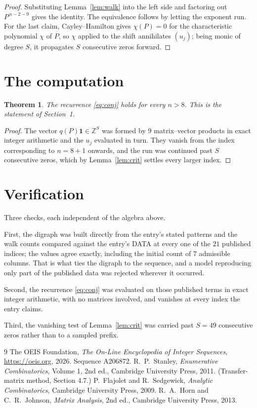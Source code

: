 \documentclass[11pt,a4paper]{article}
\theoremstyle{plain}
\newtheorem{theorem}{Theorem}
\theoremstyle{definition}
\begin{document}
\begin{proof}
Substituting Lemma~\ref{lem:walk} into the left side and factoring out
$P^{\,n-2-9}$ gives the identity. The equivalence follows by letting the exponent
run. For the last claim, Cayley--Hamilton gives $\chi(P)=0$ for the characteristic
polynomial $\chi$ of $P$, so $\chi$ applied to the shift annihilates $(u_j)$; being monic of
degree $S$, it propagates $S$ consecutive zeros forward.
\end{proof}

\section{The computation}

\begin{theorem}
The recurrence \eqref{eq:conj} holds for every $n>8$. This is the statement of
Section~1.
\end{theorem}

\begin{proof}
The vector $q(P)\mathbf{1}\in\mathbb{Z}^{S}$ was formed by $9$ matrix--vector
products in exact integer arithmetic and the $u_j$ evaluated in turn. They vanish from the
index corresponding to $n=8+1$ onwards, and the run was continued past $S$ consecutive
zeros, which by Lemma~\ref{lem:crit} settles every larger index.
\end{proof}

\section{Verification}

Three checks, each independent of the algebra above.

First, the digraph was built directly from the entry's stated patterns and the walk counts
compared against the entry's DATA at every one of the $21$ published indices; the
values agree exactly, including the initial count of $7$ admissible columns. That is
what ties the digraph to the sequence, and a model reproducing only part of the published
data was rejected wherever it occurred.

Second, the recurrence \eqref{eq:conj} was evaluated on those published terms in exact
integer arithmetic, with no matrices involved, and vanishes at every index the entry claims.

Third, the vanishing test of Lemma~\ref{lem:crit} was carried past $S=49$ consecutive
zeros rather than to a sampled prefix.

\begin{thebibliography}{9}
 The OEIS Foundation, \emph{The On-Line Encyclopedia of Integer
Sequences}, \url{https://oeis.org}, 2026. Sequence A206872.
 R.~P.~Stanley, \emph{Enumerative Combinatorics}, Volume 1, 2nd ed.,
Cambridge University Press, 2011. (Transfer-matrix method, Section 4.7.)
 P.~Flajolet and R.~Sedgewick, \emph{Analytic Combinatorics}, Cambridge
University Press, 2009.
 R.~A.~Horn and C.~R.~Johnson, \emph{Matrix Analysis}, 2nd ed., Cambridge
University Press, 2013.
\end{thebibliography}
\end{document}
